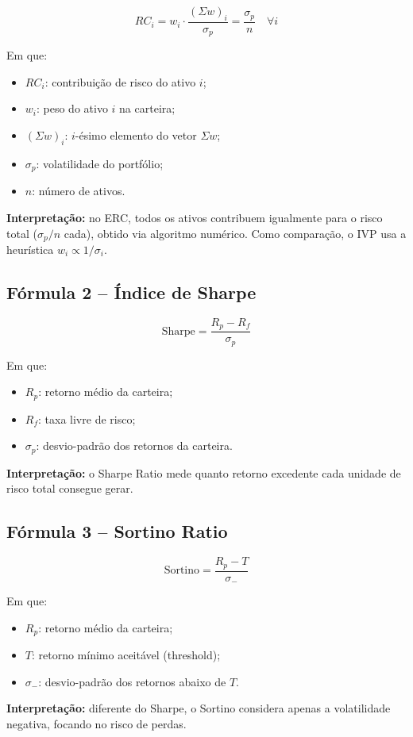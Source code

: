 \begin{equation}
RC_i = w_i \cdot \frac{(\Sigma w)_i}{\sigma_p} = \frac{\sigma_p}{n} \quad \forall i
\end{equation}

Em que:
\begin{itemize}
    \item $RC_i$: contribuição de risco do ativo $i$;
    \item $w_i$: peso do ativo $i$ na carteira;
    \item $(\Sigma w)_i$: $i$-ésimo elemento do vetor $\Sigma w$;
    \item $\sigma_p$: volatilidade do portfólio;
    \item $n$: número de ativos.
\end{itemize}

\textbf{Interpretação:} no ERC, todos os ativos contribuem igualmente para o risco total ($\sigma_p/n$ cada), obtido via algoritmo numérico. Como comparação, o IVP usa a heurística $w_i \propto 1/\sigma_i$.

\subsection{Fórmula 2 -- Índice de Sharpe}

\begin{equation}
\text{Sharpe} = \frac{R_p - R_f}{\sigma_p}
\end{equation}

Em que:
\begin{itemize}
    \item $R_p$: retorno médio da carteira;
    \item $R_f$: taxa livre de risco;
    \item $\sigma_p$: desvio-padrão dos retornos da carteira.
\end{itemize}

\textbf{Interpretação:} o Sharpe Ratio mede quanto retorno excedente cada unidade de risco total consegue gerar.

\subsection{Fórmula 3 -- Sortino Ratio}

\begin{equation}
\text{Sortino} = \frac{R_p - T}{\sigma_-}
\end{equation}

Em que:
\begin{itemize}
    \item $R_p$: retorno médio da carteira;
    \item $T$: retorno mínimo aceitável (threshold);
    \item $\sigma_-$: desvio-padrão dos retornos abaixo de $T$.
\end{itemize}

\textbf{Interpretação:} diferente do Sharpe, o Sortino considera apenas a volatilidade negativa, focando no risco de perdas.